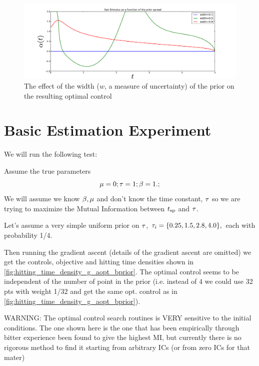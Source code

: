 \documentclass{article}
\begin{document}
\begin{figure}[h]
\begin{center} 
\includegraphics[width=\textwidth]
{Figs/FP_Adjoint/Effect_of_prior_spread.pdf} 
\caption[labelInTOC]{The effect of the width ($w$, a measure
of uncertainty) of the prior on the resulting optimal control}
\label{fig:effect_of_prior_width}
\end{center}
\end{figure}


\clearpage
\section{Basic Estimation Experiment}

We will run the following test:

Assume the true parameters $$
 {\mu } = 0; { \tau } = 1; {\beta} = 1.;
$$ We will assume we know ${\beta}, {\mu }$ and don't know the time constant, ${ \tau }$ so we
are trying to maximize the Mutual Information between ${ t_{\textrm{sp} } }$ and ${ \tau }$.
 
Let's assume a very simple uniform prior on ${ \tau }$, ${ \tau }_i = \{0.25, 1.5, 2.8
, 4.0\},$ each with probability 1/4.

Then running the gradient ascent (details of the gradient ascent are omitted) we
get the controls, objective and hitting time densities shown in 
\cref{fig:hitting_time_density_g_aopt_bprior}. The optimal control seems to be
independent of the number of point in the prior (i.e. instead of 4 we could use
32 pts with weight 1/32 and get the same opt. control as in
\cref{fig:hitting_time_density_g_aopt_bprior}). 

{\color{red} 
WARNING: The optimal control search routines is VERY sensitive to the initial
conditions. The one shown here is the one that has been empirically through
bitter experience been found to give the highest MI, but currently there is no
rigorous method to find it starting from arbitrary ICs (or from zero ICs for
that mater) }
\end{document}

